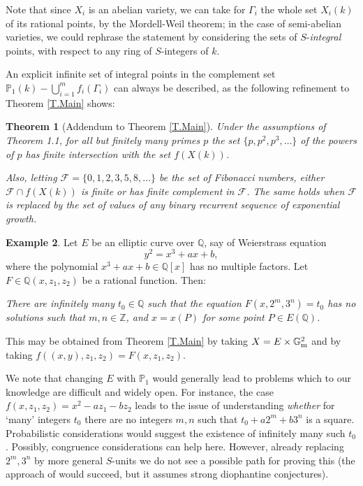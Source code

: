 \documentclass[leqno,12pt]{article} %
\def\Z{{{\mathbb Z}}}
\def\Q{{{\mathbb Q}}}
\def\P{{{\mathbb P}}}
\def\G{{{\mathbb G}}}
\theoremstyle{plain} %
\newtheorem{theorem}{\indent\sc Theorem}[section]
\theoremstyle{definition} %
\newtheorem{example}[theorem]{\indent\sc Example}
\begin{document}
Note that since $X_i$ is an abelian variety, we can take for $\Gamma_i$ the whole set $X_i(k)$ of its rational points,  by the Mordell-Weil theorem; in the case of semi-abelian varieties, we could rephrase the statement by considering the sets of $S$-{\it integral} points, with respect to any ring of $S$-integers of $k$.

\medskip

An explicit infinite set of  integral points in the complement set $\P_1(k)-\bigcup_{i=1}^mf_i(\Gamma_i)$ can always be described, as the following refinement to Theorem \ref{T.Main} shows:

\begin{theorem}[Addendum to Theorem \ref{T.Main}]\label{Addendum}
Under the assumptions of Theorem 1.1, for all but finitely many primes $p$   the set $\{p,p^2,p^3,\ldots\}$ of the powers of $p$ has finite intersection with the set $f(X(k))$. 

Also, letting $\mathcal{F}=\{0,1,2,3,5,8,\ldots\}$ be the set of Fibonacci numbers, either $\mathcal{F}\cap f(X(k))$ is  finite or has finite complement in $\mathcal{F}$.
The same holds when $\mathcal{F}$ is replaced by the set of values of any binary recurrent sequence of exponential growth. 
\end{theorem}
 
 
\begin{example}
Let $E$ be an elliptic curve over $\Q$, say of Weierstrass equation
\begin{equation}\label{E.ell-curve}
y^2= x^3+ax+b,  
\end{equation}
where the polynomial $x^3+ax+b\in\Q[x]$ has   no multiple factors. Let   $F\in\Q(x,z_1,z_2)$ be a rational function. Then:
\smallskip

{\it  There are infinitely many $t_0\in\Q$ such that the equation 
$F(x,2^m,3^n)=t_0$ has no solutions such that $m,n\in\Z$, and  $x=x(P)$  for some point $P\in E(\Q)$. }

\smallskip

This may be obtained from Theorem \ref{T.Main}  by taking $X=E\times\G_{\rm m}^2$ and  by taking $f((x,y),z_1,z_2)=F(x,z_1,z_2)$. 

We note that changing $E$ with $\P_1$ would generally lead to problems which to our knowledge are difficult and widely open. For instance, the case $f(x,z_1,z_2)= x^2-az_1-bz_2$ leads to the issue of understanding {\it whether}  for `many'   integers  $t_0$ there are  no integers $m,n$ such that $t_0+a2^m+b3^n$ is a square. Probabilistic considerations would suggest the existence of infinitely many such $t_0$. Possibly, congruence considerations can help here. However, already replacing $2^m,3^n$ by more general $S$-units  %
we do not see a possible path for proving this (the approach of \cite{B} would succeed, but it assumes strong diophantine conjectures). 
 \end{example}
\end{document}
